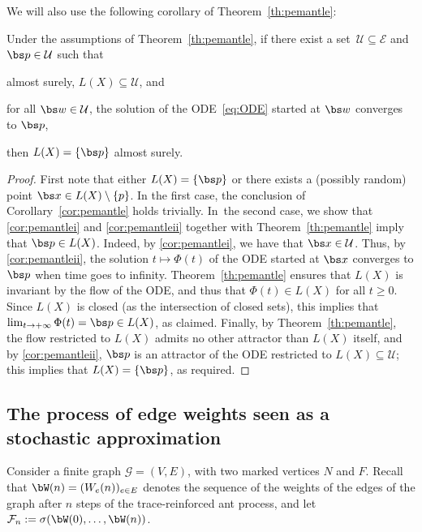 We will also use the following corollary of Theorem~\ref{th:pemantle}:
\begin{corollary}\label{cor:pemantle}
Under the assumptions of Theorem~\ref{th:pemantle}, if there {exist} a set~$\mathcal U\subseteq \mathcal E$
and $\bs p\in \mathcal U$ such that
\begin{enumeratei}
\item\label{cor:pemantlei} almost surely, $L(X)\subseteq \mathcal U$, and
\item\label{cor:pemantleii} for all $\bs w\in \mathcal U$, the solution of the ODE~\eqref{eq:ODE} started at $\bs w$ converges to $\bs p$,
\end{enumeratei}
then $L(X) = \{\bs p\}$ almost surely.
\end{corollary}
\begin{proof}
First note that either $L(X) = \{\bs p\}$ or there exists a (possibly random) point $\bs x\in L(X)\setminus\{p\}$. In the first case, the conclusion of Corollary~\ref{cor:pemantle} holds trivially.
In~the second case, we show that \eqref{cor:pemantlei} and \eqref{cor:pemantleii} together with Theorem~\ref{th:pemantle} imply that
$\bs p\in L(X)$. Indeed, by \eqref{cor:pemantlei}, we have that $\bs x\in \mathcal U$.
Thus, by \eqref{cor:pemantleii}, the solution $t\mapsto \Phi(t)$ of the ODE started at $\bs x$
converges to $\bs p$ when time goes to infinity.
Theorem~\ref{th:pemantle} ensures that $L(X)$ is {invariant} by the flow of the ODE, and thus that $\Phi(t)\in L(X)$ for all $t\geq 0$. Since $L(X)$ is closed (as the intersection of closed sets), this implies that $\lim_{t\to+\infty} \Phi(t) = \bs p\in L(X)$, as claimed.
Finally, by Theorem~\ref{th:pemantle}, the flow restricted to $L(X)$ admits no other attractor than $L(X)$ itself,
and by \eqref{cor:pemantleii}, $\bs p$ is an attractor of the ODE restricted to $L(X)\subseteq \mathcal U$;
this implies that $L(X) = \{\bs p\}$, as required.
\end{proof}

\subsection{The process of edge weights seen as a stochastic approximation}
Consider a finite graph $\mathcal G=(V,E)$, with two marked vertices $N$ and $F$. Recall that $\bW(n)=(W_e(n))_{e\in E}$ denotes the {sequence of the} weights of the edges of the graph after $n$ steps of the trace-reinforced ant process, and let $\mathcal F_n: = \sigma(\bW(0),\dots,\bW(n))$.

